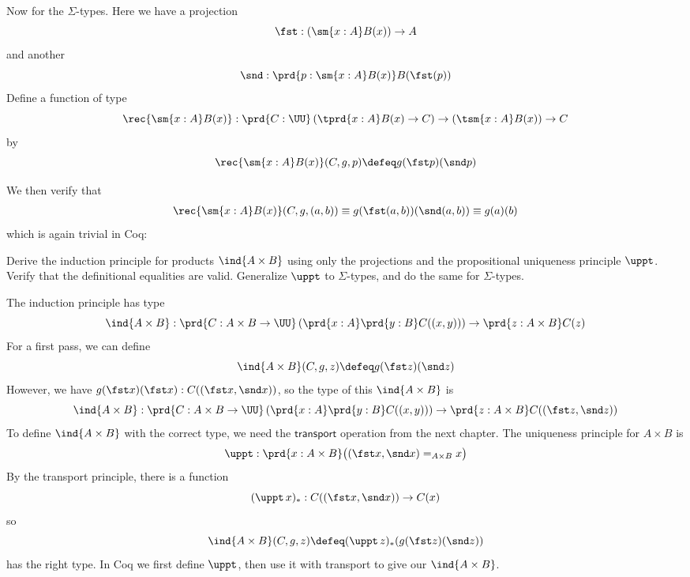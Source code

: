 \nwendcode{}Now for the $\Sigma$-types.  Here we have a projection
\[
  \fst : \left(\sm{x : A} B(x) \right) \to A
\]
and another
\[
  \snd : \prd{p : \sm{x : A} B(x)} B(\fst (p))
\]
Define a function of type 
\[
  \rec{\sm{x:A}B(x)} : \prd{C:\UU} \left(\tprd{x:A} B(x) \to C \right) \to
  \left(\tsm{x:A}B(x) \right) \to C
\]
by
\[
  \rec{\sm{x:A}B(x)}(C, g, p)
  \defeq
  g(\fst p)(\snd p)
\]

\nwenddocs{}\endmoddef
{}                       
        

\nwendcode{}We then verify that
\begin{align*}
  \rec{\sm{x:A}B(x)}(C, g, (a, b))
  \equiv g(\fst (a, b))(\snd (a, b))
  \equiv g(a)(b)
\end{align*}
which is again trivial in Coq:

\nwenddocs{}\plusendmoddef
{}                

\nwendcode{} Derive the induction principle for products $\ind{A \times B}$
using only the projections and the propositional uniqueness principle $\uppt$.
Verify that the definitional equalities are valid.  Generalize $\uppt$ to
$\Sigma$-types, and do the same for $\Sigma$-types.

\soln The induction principle has type
\[
  \ind{A\times B} : \prd{C: A\times B \to \UU}\left(\prd{x:A}\prd{y:B}C((x,
    y))\right) \to \prd{z:A\times B}C(z)
\]
For a first pass, we can define
\[
  \ind{A\times B}(C, g, z)
  \defeq
  g(\fst z)(\snd z)
\]
However, we have $g(\fst x)(\fst x) : C((\fst x, \snd x))$, so the type of this
$\ind{A \times B}$ is
\[
  \ind{A\times B} : \prd{C: A\times B \to \UU}\left(\prd{x:A}\prd{y:B}C((x,
    y))\right) \to \prd{z:A\times B}C((\fst z, \snd z))
\]
To define $\ind{A \times B}$ with the correct type, we need the
$\mathsf{transport}$ operation from the next chapter.  The uniqueness principle
for $A \times B$ is
\[
  \uppt : \prd{x : A \times B} \big((\fst x, \snd x) =_{A \times B} x\big)
\]
By the transport principle, there is a function
\[
  (\uppt\, x)_{*} : C((\fst x, \snd x)) \to C(x)
\]
so
\[
  \ind{A \times B}(C, g, z)
  \defeq
  (\uppt\, z)_{*}(g(\fst z)(\snd z))
\]
has the right type.
In Coq we first define $\uppt$, then use it with transport to give our
$\ind{A\times B}$.

